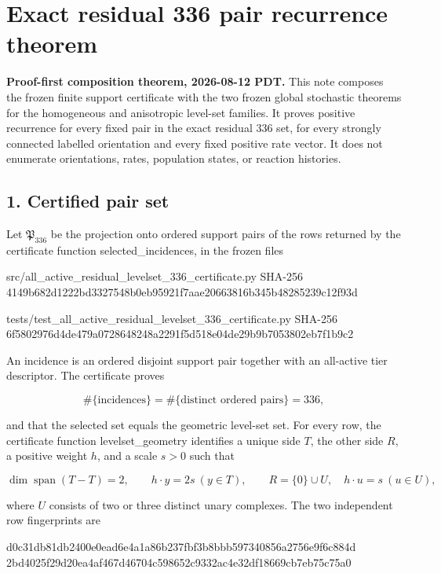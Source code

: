 \section{Exact residual 336 pair recurrence
theorem}

\textbf{Proof-first composition theorem, 2026-08-12 PDT.} This note
composes the frozen finite support certificate with the two frozen
global stochastic theorems for the homogeneous and anisotropic level-set
families. It proves positive recurrence for every fixed pair in the
exact residual 336 set, for every strongly connected labelled
orientation and every fixed positive rate vector. It does not enumerate
orientations, rates, population states, or reaction histories.

\subsection{1. Certified pair set}

Let \({\mathfrak P}_{336}\) be the projection onto ordered support pairs
of the rows returned by the certificate function selected\_incidences,
in the frozen files

\begin{CodeBlock}
src/all_active_residual_levelset_336_certificate.py
SHA-256 4149b682d1222bd3327548b0eb95921f7aae20663816b345b48285239c12f93d

tests/test_all_active_residual_levelset_336_certificate.py
SHA-256 6f5802976d4de479a0728648248a2291f5d518e04de29b9b7053802eb7f1b9c2
\end{CodeBlock}

An incidence is an ordered disjoint support pair together with an
all-active tier descriptor. The certificate proves

\[
 \#\{\text{incidences}\}
 =\#\{\text{distinct ordered pairs}\}
 =336,                                                 \tag{1.1}
\]

and that the selected set equals the geometric level-set set. For every
row, the certificate function levelset\_geometry identifies a unique
side \(T\), the other side \(R\), a positive weight \(h\), and a scale
\(s>0\) such that

\[
 \dim\operatorname{span}(T-T)=2,\qquad
 h\cdot y=2s\ (y\in T),\qquad
 R=\{0\}\cup U,\quad h\cdot u=s\ (u\in U),             \tag{1.2}
\]

where \(U\) consists of two or three distinct unary complexes. The two
independent row fingerprints are

\begin{CodeBlock}
d0c31db81db2400e0ead6e4a1a86b237fbf3b8bbb597340856a2756e9f6c884d
2bd4025f29d20ea4af467d46704c598652c9332ac4e32df18669cb7eb75c75a0
\end{CodeBlock}

